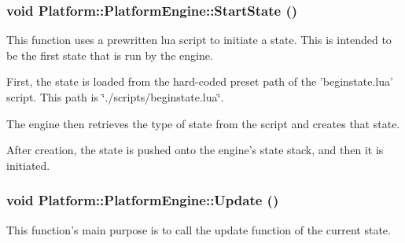 \hypertarget{class_platform_1_1_platform_engine_7ec18621f367de9dd678a2d48a139a40}{
\subsubsection[{StartState}]{\setlength{\rightskip}{0pt plus 5cm}void Platform::PlatformEngine::StartState ()}}
\label{d2/dd5/class_platform_1_1_platform_engine_7ec18621f367de9dd678a2d48a139a40}


This function uses a prewritten lua script to initiate a state. This is intended to be the first state that is run by the engine. 

First, the state is loaded from the hard-coded preset path of the 'beginstate.lua' script. This path is \char`\"{}./scripts/beginstate.lua\char`\"{}.

The engine then retrieves the type of state from the script and creates that state.

After creation, the state is pushed onto the engine's state stack, and then it is initiated.\hypertarget{class_platform_1_1_platform_engine_7f4d1cf999344461cd15dda4106a9e20}{
\subsubsection[{Update}]{\setlength{\rightskip}{0pt plus 5cm}void Platform::PlatformEngine::Update ()}}
\label{d2/dd5/class_platform_1_1_platform_engine_7f4d1cf999344461cd15dda4106a9e20}


This function's main purpose is to call the update function of the current state. 
